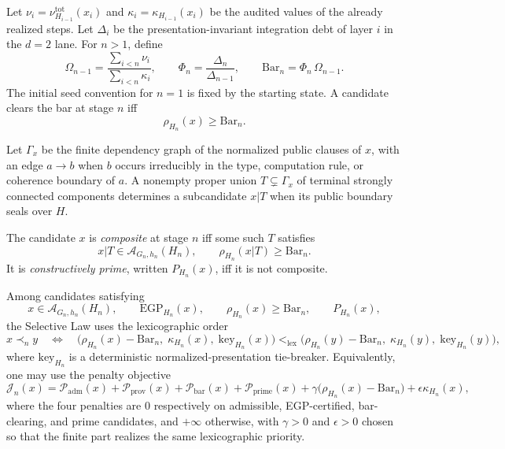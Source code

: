 \begin{definition}
Let \(\nu_i=\nu^{\mathrm{tot}}_{H_{i-1}}(x_i)\) and
\(\kappa_i=\kappa_{H_{i-1}}(x_i)\) be the audited values of the already realized
steps. Let \(\Delta_i\) be the presentation-invariant integration debt of layer
\(i\) in the \(d=2\) lane. For \(n>1\), define
\[
\Omega_{n-1}
=
\frac{\sum_{i<n}\nu_i}{\sum_{i<n}\kappa_i},
\qquad
\Phi_n
=
\frac{\Delta_n}{\Delta_{n-1}},
\qquad
\mathrm{Bar}_n
=
\Phi_n\,\Omega_{n-1}.
\]
The initial seed convention for \(n=1\) is fixed by the starting state. A
candidate clears the bar at stage \(n\) iff
\[
\rho_{H_n}(x)\ge \mathrm{Bar}_n.
\]
\end{definition}

\begin{definition}
Let \(\Gamma_x\) be the finite dependency graph of the normalized public clauses
of \(x\), with an edge \(a\to b\) when \(b\) occurs irreducibly in the type,
computation rule, or coherence boundary of \(a\). A nonempty proper union
\(T\subsetneq\Gamma_x\) of terminal strongly connected components determines a
subcandidate \(x|T\) when its public boundary seals over \(H\).

The candidate \(x\) is \emph{composite} at stage \(n\) iff some such \(T\)
satisfies
\[
x|T\in\mathcal{A}_{G_n,h_n}(H_n),
\qquad
\rho_{H_n}(x|T)\ge \mathrm{Bar}_n.
\]
It is \emph{constructively prime}, written \(P_{H_n}(x)\), iff it is not
composite.
\end{definition}

\begin{definition}
Among candidates satisfying
\[
x\in\mathcal{A}_{G_n,h_n}(H_n),
\qquad
\mathrm{EGP}_{H_n}(x),
\qquad
\rho_{H_n}(x)\ge\mathrm{Bar}_n,
\qquad
P_{H_n}(x),
\]
the Selective Law uses the lexicographic order
\[
x\prec_n y
\quad\Longleftrightarrow\quad
\bigl(
\rho_{H_n}(x)-\mathrm{Bar}_n,\;
\kappa_{H_n}(x),\;
\mathrm{key}_{H_n}(x)
\bigr)
<
_{\mathrm{lex}}
\bigl(
\rho_{H_n}(y)-\mathrm{Bar}_n,\;
\kappa_{H_n}(y),\;
\mathrm{key}_{H_n}(y)
\bigr),
\]
where \(\mathrm{key}_{H_n}\) is a deterministic normalized-presentation
tie-breaker. Equivalently, one may use the penalty objective
\[
\mathcal{J}_n(x)
=
\mathcal{P}_{\mathrm{adm}}(x)
+\mathcal{P}_{\mathrm{prov}}(x)
+\mathcal{P}_{\mathrm{bar}}(x)
+\mathcal{P}_{\mathrm{prime}}(x)
+\gamma\bigl(\rho_{H_n}(x)-\mathrm{Bar}_n\bigr)
+\epsilon\kappa_{H_n}(x),
\]
where the four penalties are \(0\) respectively on admissible, EGP-certified,
bar-clearing, and prime candidates, and \(+\infty\) otherwise, with
\(\gamma>0\) and
\(\epsilon>0\) chosen so that the finite part realizes the same lexicographic
priority.
\end{definition}

